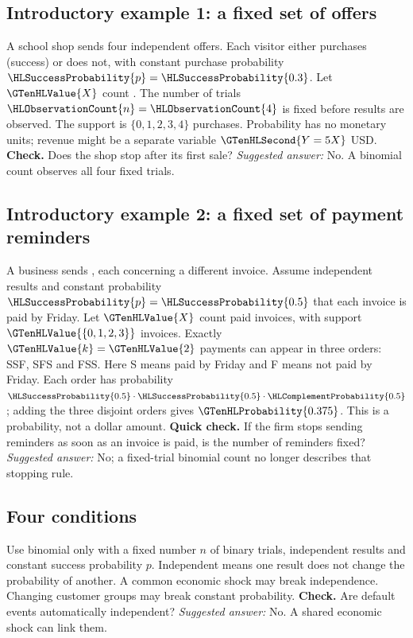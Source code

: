 \subsection{Introductory example 1: a fixed set of offers}\label{ex:intro-one}
A school shop sends four independent offers. Each visitor either purchases (success) or does not, with constant purchase probability $\HLSuccessProbability{p}=\HLSuccessProbability{0.3}$. Let $\GTenHLValue{X}$ count . The number of trials $\HLObservationCount{n}=\HLObservationCount{4}$ is fixed before results are observed. The support is $\{0,1,2,3,4\}$ purchases. Probability has no monetary units; revenue might be a separate variable $\GTenHLSecond{Y=5X}$ USD.
\textbf{Check.} Does the shop stop after its first sale? \emph{Suggested answer:} No. A binomial count observes all four fixed trials.


\clearpage
\subsection{Introductory example 2: a fixed set of payment reminders}\label{ex:intro-two}
A business sends , each concerning a different invoice. Assume independent results and constant probability $\HLSuccessProbability{p}=\HLSuccessProbability{0.5}$ that each invoice is paid by Friday. Let $\GTenHLValue{X}$ count paid invoices, with support $\GTenHLValue{\{0,1,2,3\}}$ invoices. Exactly $\GTenHLValue{k}=\GTenHLValue{2}$ payments can appear in three orders: SSF, SFS and FSS. Here S means paid by Friday and F means not paid by Friday. Each order has probability $\HLSuccessProbability{0.5}\cdot\HLSuccessProbability{0.5}\cdot\HLComplementProbability{0.5}$; adding the three disjoint orders gives $\GTenHLProbability{0.375}$. This is a probability, not a dollar amount.
\textbf{Quick check.} If the firm stops sending reminders as soon as an invoice is paid, is the number of reminders fixed? \emph{Suggested answer:} No; a fixed-trial binomial count no longer describes that stopping rule.

\subsection{Four conditions}
Use binomial only with a fixed number $n$ of binary trials, independent results and constant success probability $p$. Independent means one result does not change the probability of another. A common economic shock may break independence. Changing customer groups may break constant probability.
\textbf{Check.} Are default events automatically independent? \emph{Suggested answer:} No. A shared economic shock can link them.


